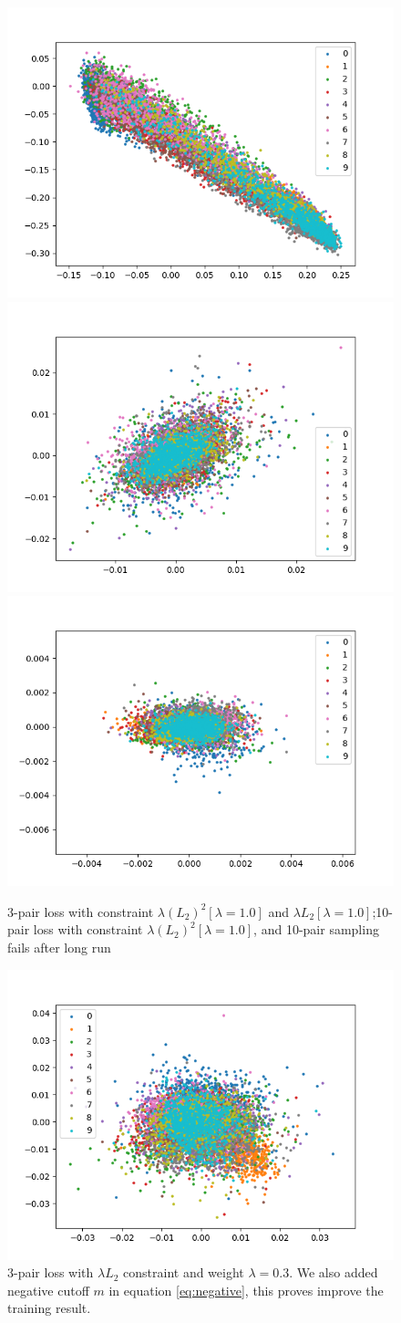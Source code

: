 \documentclass[10pt,twocolumn,letterpaper]{article}
\begin{document}
			\begin{figure}[t]
				
				\begin{center}
					\includegraphics[width=0.5\linewidth]{fig1000}\includegraphics[width=0.5\linewidth]{fig600}
					\includegraphics[width=0.5\linewidth]{fig2500}
					\caption{3-pair loss with constraint $\lambda (L_2)^2[\lambda=1.0]$ and $\lambda L_2[\lambda=1.0]$;10-pair loss with constraint $\lambda (L_2)^2[\lambda=1.0]$, and 10-pair sampling fails after long run}
					\includegraphics[width=0.9\linewidth]{fig150}
				\end{center}
				\caption{3-pair loss with $\lambda L_2$ constraint and weight $\lambda=0.3$.  We also added negative cutoff $m$ in equation \ref{eq:negative}, this proves improve the training result.}
				

\end{figure}
\end{document}
